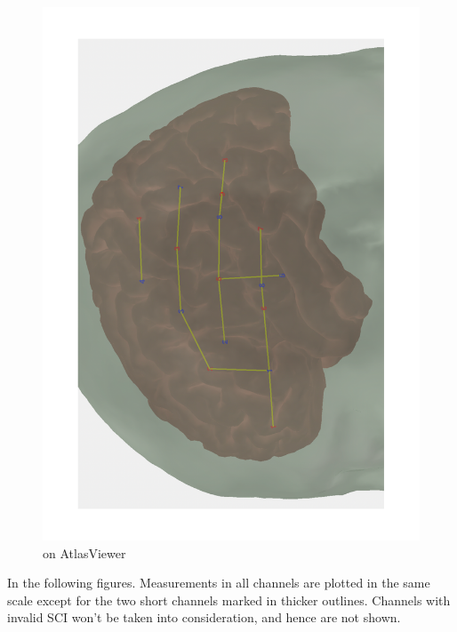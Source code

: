 \begin{figure}[H]
\begin{minipage}[c]{.22\linewidth}
  \includegraphics[scale= 0.2, angle = -90, origin= c] {pdf/atlas_optode_template}
  \caption{on AtlasViewer}
  \label{fig:test2}
\end{minipage}
\end{figure}

In the following figures. Measurements in all channels are plotted in the same scale except for the two short channels marked in thicker outlines. Channels with invalid SCI won't be taken into consideration, and hence are not shown.
